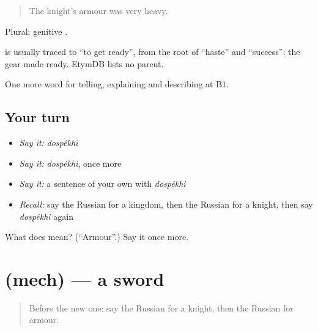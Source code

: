 \begin{quote}
The knight's armour was very heavy.
\end{quote}

Plural; genitive \emph{}.

\begin{cousinweb}
\emph{} is usually traced to \emph{} \textquotedblleft{}to get ready\textquotedblright{}, from the root of \emph{} \textquotedblleft{}haste\textquotedblright{} and \emph{} \textquotedblleft{}success\textquotedblright{}: the gear made ready. EtymDB lists no parent.
\end{cousinweb}

\begin{grammarlens}[title={What you've built}]
One more word for telling, explaining and describing at B1.
\end{grammarlens}

\subsection*{Your turn}
\begin{itemize}
\raggedright
  \item \emph{Say it:} \emph{dospékhi}
  \item \emph{Say it:} \emph{dospékhi}, once more
  \item \emph{Say it:} a sentence of your own with \emph{dospékhi}
  \item \emph{Recall:} say the Russian for a kingdom, then the Russian for a knight, then say \emph{dospékhi} again
\end{itemize}

\begin{tcolorbox}[breakable,colback=teal!4,colframe=teal!35!black,title={Before you move on}]
What does  mean? (\textquotedblleft{}Armour\textquotedblright{}.) Say it once more.
\end{tcolorbox}
\section[\texorpdfstring{\ru{меч} (mech)}{меч (mech)}]{ (mech) — a sword}

\label{lesson:RU-C322-mech}



\begin{quote}
Before the new one: say the Russian for a knight, then the Russian for armour.
\end{quote}

